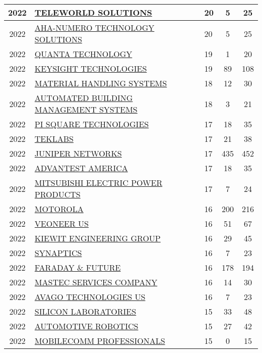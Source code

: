 \documentclass{article}%
\begin{document}
\begin{longtable}{c|p{20em}|p{5em}|c|c}
\hline%
2022&\hyperref[subsec:TELEWORLDSOLUTIONS]{TELEWORLD SOLUTIONS}&20&5&25\\%
\hline%
2022&\hyperref[subsec:AHA{-}NUMEROTECHNOLOGYSOLUTIONS]{AHA{-}NUMERO TECHNOLOGY SOLUTIONS}&20&5&25\\%
\hline%
2022&\hyperref[subsec:QUANTATECHNOLOGY]{QUANTA TECHNOLOGY}&19&1&20\\%
\hline%
2022&\hyperref[subsec:KEYSIGHTTECHNOLOGIES]{KEYSIGHT TECHNOLOGIES}&19&89&108\\%
\hline%
2022&\hyperref[subsec:MATERIALHANDLINGSYSTEMS]{MATERIAL HANDLING SYSTEMS}&18&12&30\\%
\hline%
2022&\hyperref[subsec:AUTOMATEDBUILDINGMANAGEMENTSYSTEMS]{AUTOMATED BUILDING MANAGEMENT SYSTEMS}&18&3&21\\%
\hline%
2022&\hyperref[subsec:PISQUARETECHNOLOGIES]{PI SQUARE TECHNOLOGIES}&17&18&35\\%
\hline%
2022&\hyperref[subsec:TEKLABS]{TEKLABS}&17&21&38\\%
\hline%
2022&\hyperref[subsec:JUNIPERNETWORKS]{JUNIPER NETWORKS}&17&435&452\\%
\hline%
2022&\hyperref[subsec:ADVANTESTAMERICA]{ADVANTEST AMERICA}&17&18&35\\%
\hline%
2022&\hyperref[subsec:MITSUBISHIELECTRICPOWERPRODUCTS]{MITSUBISHI ELECTRIC POWER PRODUCTS}&17&7&24\\%
\hline%
2022&\hyperref[subsec:MOTOROLA]{MOTOROLA}&16&200&216\\%
\hline%
2022&\hyperref[subsec:VEONEERUS]{VEONEER US}&16&51&67\\%
\hline%
2022&\hyperref[subsec:KIEWITENGINEERINGGROUP]{KIEWIT ENGINEERING GROUP}&16&29&45\\%
\hline%
2022&\hyperref[subsec:SYNAPTICS]{SYNAPTICS}&16&7&23\\%
\hline%
2022&\hyperref[subsec:FARADAYFUTURE]{FARADAY \& FUTURE}&16&178&194\\%
\hline%
2022&\hyperref[subsec:MASTECSERVICESCOMPANY]{MASTEC SERVICES COMPANY}&16&14&30\\%
\hline%
2022&\hyperref[subsec:AVAGOTECHNOLOGIESUS]{AVAGO TECHNOLOGIES US}&16&7&23\\%
\hline%
2022&\hyperref[subsec:SILICONLABORATORIES]{SILICON LABORATORIES}&15&33&48\\%
\hline%
2022&\hyperref[subsec:AUTOMOTIVEROBOTICS]{AUTOMOTIVE ROBOTICS}&15&27&42\\%
\hline%
2022&\hyperref[subsec:MOBILECOMMPROFESSIONALS]{MOBILECOMM PROFESSIONALS}&15&0&15\\%

\end{longtable}
\end{document}
